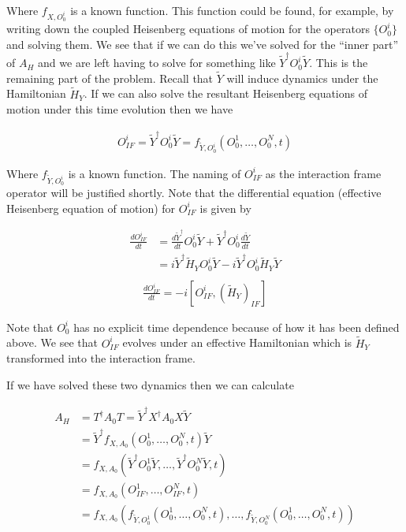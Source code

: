 \documentclass[12pt]{article}
\newcommand{\ddt}[1]{\frac{d #1}{dt}}
\begin{document}
Where $f_{X,O_0^i}$ is a known function. This function could be found, for example, by writing down the coupled Heisenberg equations of motion for the operators $\{O_0^i\}$ and solving them. We see that if we can do this we've solved for the ``inner part'' of $A_H$ and we are left having to solve for something like $\tilde{Y}^{\dag}O_0^i\tilde{Y}$. This is the remaining part of the problem. Recall that $\tilde{Y}$ will induce dynamics under the Hamiltonian $\tilde{H}_Y$. If we can also solve the resultant Heisenberg equations of motion under this time evolution then we have 

\begin{align}
O^i_{IF} = \tilde{Y}^{\dag}O^i_0\tilde{Y} = f_{\tilde{Y},O^i_0}\left(O_0^1,\ldots,O_0^N,t \right)
\end{align}

Where $f_{\tilde{Y},O^i_0}$ is a known function. The naming of $O^i_{IF}$ as the interaction frame operator will be justified shortly. Note that the differential equation (effective Heisenberg equation of motion) for $O^i_{IF}$ is given by

\begin{align}
\ddt{O^i_{IF}} &= \ddt{\tilde{Y}^{\dag}}O_0^i \tilde{Y} + \tilde{Y}^{\dag}O_0^i\ddt{\tilde{Y}}\\
&= i\tilde{Y}^{\dag}\tilde{H}_YO_0^i\tilde{Y} - i \tilde{Y}^{\dag}O_0^i\tilde{H}_Y\tilde{Y}\\
\end{align}
\begin{align}
\boxed{
\ddt{O_{IF}^i}= -i\left[O^i_{IF},\left(\tilde{H}_Y\right)_{IF}\right]
}
\end{align}

Note that $O_0^i$ has no explicit time dependence because of how it has been defined above. We see that $O_{IF}^i$ evolves under an effective Hamiltonian which is $\tilde{H}_Y$ transformed into the interaction frame.

If we have solved these two dynamics then we can calculate

\begin{align}
A_H &= T^{\dag}A_0T = \tilde{Y}^{\dag}X^{\dag}A_0X\tilde{Y}\\
&= \tilde{Y}^{\dag} f_{X,A_0}\left(O_0^1,\ldots,O_0^N,t\right) \tilde{Y}\\
&= f_{X,A_0}\left(\tilde{Y}^{\dag}O_0^1\tilde{Y},\ldots,\tilde{Y}^{\dag}O_0^N\tilde{Y},t \right)\\
&= f_{X,A_0}\left(O_{IF}^1,\ldots,O_{IF}^N,t \right)\\
&=
f_{X,A_0}\left(f_{\tilde{Y},O_0^1}\left(O_0^1,\ldots,O_0^N,t\right),\ldots,f_{\tilde{Y},O_0^N}\left(O_0^1,\ldots,O_0^N,t\right)\right)
\end{align}
\end{document}
